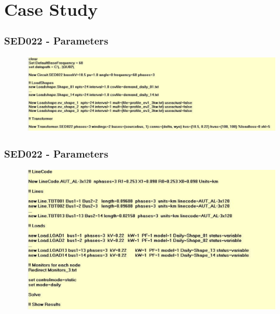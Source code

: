 \documentclass[10pt, aspectratio=1610]{beamer}
\begin{document}
\section{Case Study}

\begin{frame}
    \frametitle{SED022 - Parameters}
    \begin{figure}
        \includegraphics[width = \textwidth]{../Figures/code_1.pdf}
    \end{figure}
\end{frame}
\begin{frame}
    \frametitle{SED022 - Parameters}
    \begin{figure}
        \includegraphics[width = \textwidth]{../Figures/code_2.pdf}
    \end{figure}
\end{frame}

\end{document}
